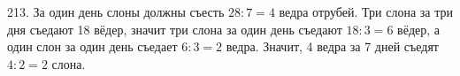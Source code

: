 213. За один день слоны должны съесть $28:7=4$ ведра отрубей. Три слона за три дня съедают 18 вёдер, значит три слона за один день съедают $18:3=6$ вёдер, а один слон за один день съедает $6:3=2$ ведра. Значит, 4 ведра за 7 дней съедят $4:2=2$ слона.\\
